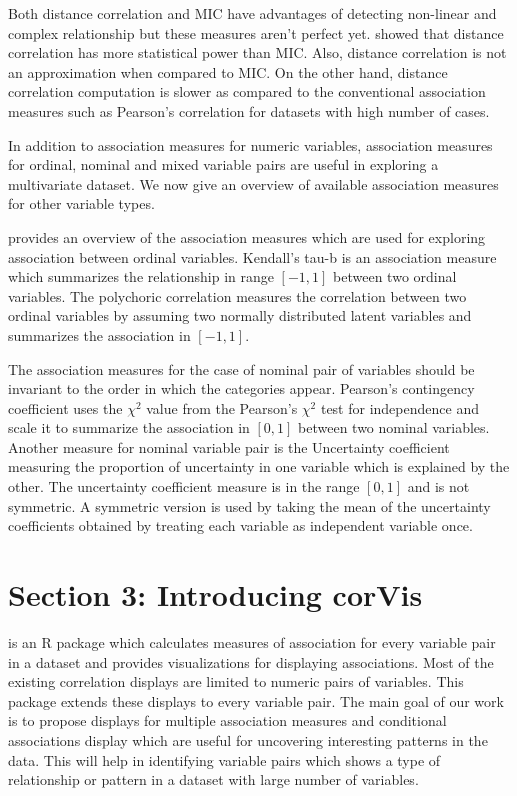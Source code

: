 Both distance correlation and MIC have advantages of detecting
non-linear and complex relationship but these measures aren't perfect
yet. \citet{commentSimonTibshirani} showed that distance correlation has
more statistical power than MIC. Also, distance correlation is not an
approximation when compared to MIC. On the other hand, distance
correlation computation is slower as compared to the conventional
association measures such as Pearson's correlation for datasets with
high number of cases.

In addition to association measures for numeric variables, association
measures for ordinal, nominal and mixed variable pairs are useful in
exploring a multivariate dataset. We now give an overview of available
association measures for other variable types.

\citet{agresti2010analysis} provides an overview of the association
measures which are used for exploring association between ordinal
variables. Kendall's tau-b \citep{kendall1945treatment} is an
association measure which summarizes the relationship in range
\([-1,1]\) between two ordinal variables. The polychoric correlation
\citep{olsson1979maximum} measures the correlation between two ordinal
variables by assuming two normally distributed latent variables and
summarizes the association in \([-1,1]\).

The association measures for the case of nominal pair of variables
should be invariant to the order in which the categories appear.
Pearson's contingency coefficient uses the \({\chi}^2\) value from the
Pearson's \({\chi}^2\) test for independence and scale it to summarize
the association in \([0,1]\) between two nominal variables. Another
measure for nominal variable pair is the Uncertainty coefficient
\citep{theil1970estimation} measuring the proportion of uncertainty in
one variable which is explained by the other. The uncertainty
coefficient measure is in the range \([0,1]\) and is not symmetric. A
symmetric version is used by taking the mean of the uncertainty
coefficients obtained by treating each variable as independent variable
once.

\hypertarget{section-3-introducing-corvis}{%
\section{Section 3: Introducing
corVis}\label{section-3-introducing-corvis}}

 is an R package which calculates measures of
association for every variable pair in a dataset and provides
visualizations for displaying associations. Most of the existing
correlation displays are limited to numeric pairs of variables. This
package extends these displays to every variable pair. The main goal of
our work is to propose displays for multiple association measures and
conditional associations display which are useful for uncovering
interesting patterns in the data. This will help in identifying variable
pairs which shows a type of relationship or pattern in a dataset with
large number of variables.

